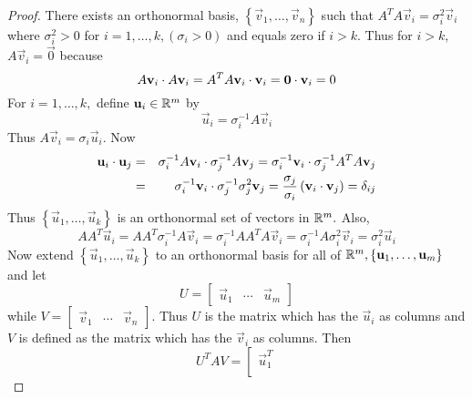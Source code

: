 \documentclass{ximera}
\begin{document}
\begin{proof}
There exists an orthonormal basis, $\left\{ \vec{v}_{1}, \dots, \vec{v}_n\right\}$ such that $
A^TA\vec{v}_{i}=\sigma _{i}^{2}\vec{v}_{i}$ where $\sigma
_{i}^{2}>0$ for $i=1,\dots ,k,\left( \sigma _{i}>0\right) $ and equals zero
if $i>k.$ Thus for $i>k,$ $A\vec{v}_{i}=\vec{0}$ because
\begin{equation*}
 A\mathbf{v}_{i}\cdot A\mathbf{v}_{i} = A^TA\mathbf{v}_{i} \cdot \mathbf{v}_{i}  = \mathbf{0} \cdot \mathbf{v}_{i} =0
\end{equation*}
For $i=1,\dots ,k,$ define $\mathbf{u}_{i}\in \mathbb{R}^{m}$ by
\begin{equation*}
\vec{u}_{i}= \sigma _{i}^{-1}A\vec{v}_{i}
\end{equation*}
Thus $A\vec{v}_{i}=\sigma _{i}\vec{u}_{i}.$ Now
\begin{eqnarray*}
\mathbf{u}_{i} \cdot \mathbf{u}_{j} &=&  \sigma _{i}^{-1}A
\mathbf{v}_{i} \cdot \sigma _{j}^{-1}A\mathbf{v}_{j}  = \sigma_{i}^{-1}\mathbf{v}_{i} \cdot \sigma _{j}^{-1}A^TA\mathbf{v}_{j} \\
&=& \sigma _{i}^{-1}\mathbf{v}_{i} \cdot \sigma _{j}^{-1}\sigma _{j}^{2} \mathbf{v}_{j} =
\frac{\sigma _{j}}{\sigma _{i}}\left( \mathbf{v}_{i} \cdot \mathbf{v}_{j}\right)
=\delta _{ij}
\end{eqnarray*}
Thus $\left\{ \vec{u}_{1}, \dots, \vec{u}_{k}\right\}$ is an orthonormal set of
vectors in $\mathbb{R}^{m}.$ Also,
\begin{equation*}
AA^T\vec{u}_{i}=AA^T\sigma _{i}^{-1}A\vec{v}_{i}=\sigma
_{i}^{-1}AA^TA\vec{v}_{i}=\sigma _{i}^{-1}A\sigma _{i}^{2}\vec{v}
_{i}=\sigma _{i}^{2}\vec{u}_{i}
\end{equation*}
Now extend $\left\{ \vec{u}_{1}, \dots, \vec{u}_{k}\right\}$ to an orthonormal
basis for all of $\mathbb{R}^{m},\left\{ \mathbf{u}_{1},\dots,\mathbf{u}_{m}\right\}$
and let
\begin{equation*}
U= \left[
\begin{array}{ccc}
\vec{u}_{1} & \cdots & \vec{u}_{m}
\end{array}
\right]
\end{equation*}
while $V= \left[ \begin{array}{ccc} \vec{v}_{1} & \cdots & \vec{v}_{n}\end{array}\right] .$ Thus $U$
is the matrix which has the $\vec{u}_{i}$ as columns and $V$ is defined
as the matrix which has the $\vec{v}_{i}$ as columns. Then
\begin{equation*}
U^TAV=\left[
\begin{array}{c}
\vec{u}_{1}^T \\

\end{array}
\end{equation*}
\end{proof}
\end{document}
